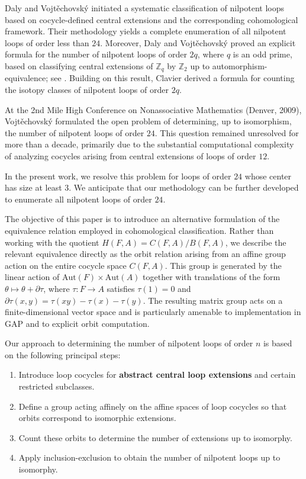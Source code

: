\documentclass[12pt,a4paper]{amsart}
\theoremstyle{definition}
\begin{document}
Daly and Vojt\v{e}chovsk\'y \cite{DalyVojtechovsky2009} initiated a systematic classification of nilpotent loops based on cocycle-defined central extensions and the corresponding cohomological framework. Their methodology yields a complete enumeration of all nilpotent loops of order less than $24$. Moreover, Daly and Vojt\v{e}chovsk\'y proved an explicit formula for the number of nilpotent loops of order $2q$, where $q$ is an odd prime, based on classifying central extensions of $\mathbb{Z}_q$ by $\mathbb{Z}_2$ up to automorphism-equivalence; see \cite[Theorem 7.1]{DalyVojtechovsky2009}. Building on this result, Clavier \cite{clavier2012enumeration} derived a formula for counting the isotopy classes of nilpotent loops of order $2q$. 

At the 2nd Mile High Conference on Nonassociative Mathematics (Denver, 2009), Vojt\v{e}chovsk\'y \cite{Vojtechovsky2009_ProblemNilpotentLoops24} formulated the open problem of determining, up to isomorphism, the number of nilpotent loops of order $24$. This question remained unresolved for more than a decade, primarily due to the substantial computational complexity of analyzing cocycles arising from central extensions of loops of order $12$. 

In the present work, we resolve this problem for loops of order $24$ whose center has size at least $3$. We anticipate that our methodology can be further developed to enumerate all nilpotent loops of order $24$.


The objective of this paper is to introduce an alternative formulation of the equivalence relation employed in cohomological classification. 
Rather than working with the quotient $H(F, A) = C(F, A) / B(F, A)$, we describe the relevant equivalence directly as the orbit relation arising from an affine group action on the entire cocycle space $C(F, A)$. 
This group is generated by the linear action of $\mathrm{Aut}(F)\times \mathrm{Aut}(A)$ together with translations of the form $\theta \mapsto \theta + \partial \tau$, where $\tau : F \to A$ satisfies $\tau(1) = 0$ and $\partial\tau(x,y)=\tau(xy)-\tau(x)-\tau(y)$.  
The resulting matrix group acts on a finite-dimensional vector space and is particularly amenable to implementation in GAP and to explicit orbit computation.

Our approach to determining the number of nilpotent loops of order $n$ is based on the following principal steps:

\begin{enumerate}
\item Introduce loop cocycles for \textbf{abstract central loop extensions} and certain restricted subclasses.
\item Define a group acting affinely on the affine spaces of loop cocycles so that orbits correspond to isomorphic extensions.
\item Count these orbits to determine the number of extensions up to isomorphy.
\item Apply inclusion-exclusion to obtain the number of nilpotent loops up to isomorphy.
\end{enumerate}
\end{document}
